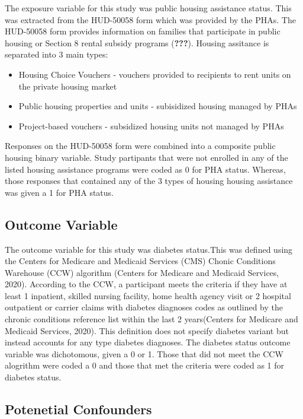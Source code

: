 \documentclass [11pt, proquest] {uwthesis}[2015/03/03]
\providecommand{\tightlist}{%
  \setlength{\itemsep}{0pt}\setlength{\parskip}{0pt}}
\begin{document}
The exposure variable for this study was public housing assistance
status. This was extracted from the HUD-50058 form which was provided by
the PHAs. The HUD-50058 form provides information on families that
participate in public housing or Section 8 rental subsidy programs
({\textbf{???}}). Housing assitance is separated into 3 main types:
\begin{itemize}
\tightlist
\item
  Housing Choice Vouchers - vouchers provided to recipients to rent
  units on the private housing market
\item
  Public housing properties and units - subisidized housing managed by
  PHAs
\item
  Project-based vouchers - subsidized housing units not managed by PHAs
\end{itemize}
Responses on the HUD-50058 form were combined into a composite public
housing binary variable. Study partipants that were not enrolled in any
of the listed housing assistance programs were coded as 0 for PHA
status. Whereas, those responses that contained any of the 3 types of
housing housing assistance was given a 1 for PHA status.

\subsection{Outcome Variable}\label{outcome-variable}

The outcome variable for this study was diabetes status.This was defined
using the Centers for Medicare and Medicaid Services (CMS) Chonic
Conditions Warehouse (CCW) algorithm (Centers for Medicare and Medicaid
Services, 2020). According to the CCW, a participant meets the criteria
if they have at least 1 inpatient, skilled nursing facility, home health
agency visit or 2 hospital outpatient or carrier claims with diabetes
diagnoses codes as outlined by the chronic conditions reference list
within the last 2 years(Centers for Medicare and Medicaid Services,
2020). This definition does not specify diabetes variant but instead
accounts for any type diabetes diagnoses. The diabetes status outcome
variable was dichotomous, given a 0 or 1. Those that did not meet the
CCW alogrithm were coded a 0 and those that met the criteria were coded
as 1 for diabetes status.

\subsection{Potenetial Confounders}\label{potenetial-confounders}
\end{document}
